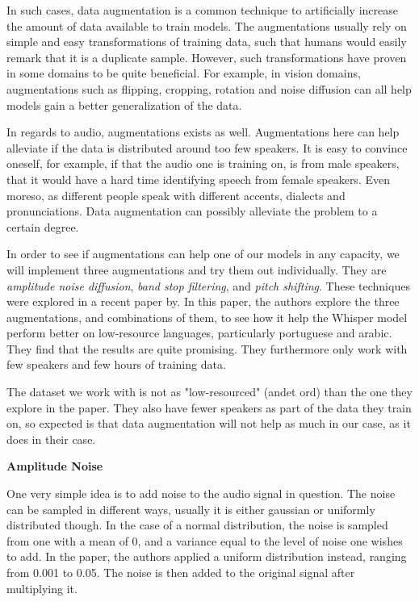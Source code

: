 In such cases, data augmentation is a common technique to artificially increase the amount of data available to train models. The augmentations usually rely on simple and easy transformations of training data, such that humans would easily remark that it is a duplicate sample. However, such transformations have proven in some domains to be quite beneficial. For example, in vision domains, augmentations such as flipping, cropping, rotation and noise diffusion can all help models gain a better generalization of the data.\cite{perez_effectiveness_2017}

In regards to audio, augmentations exists as well. Augmentations here can help alleviate if the data is distributed around too few speakers. It is easy to convince oneself, for example, if that the audio one is training on, is from male speakers, that it would have a hard time identifying speech from female speakers. Even moreso, as different people speak with different accents, dialects and pronunciations. Data augmentation can possibly alleviate the problem to a certain degree.

In order to see if augmentations can help one of our models in any capacity, we will implement three augmentations and try them out individually. They are \textit{amplitude noise diffusion}, \textit{band stop filtering}, and \textit{pitch shifting}. These techniques were explored in a recent paper by. \cite{anidjar_whisper_2024} In this paper, the authors explore the three augmentations, and combinations of them, to see how it help the Whisper model perform better on low-resource languages, particularly portuguese and arabic. They find that the results are quite promising. They furthermore only work with few speakers and few hours of training data.

The dataset we work with is not as "low-resourced" (andet ord) than the one they explore in the paper. They also have fewer speakers as part of the data they train on, so expected is that data augmentation will not help as much in our case, as it does in their case.

\textbf{Amplitude Noise}

One very simple idea is to add noise to the audio signal in question. The noise can be sampled in different ways, usually it is either gaussian or uniformly distributed though. In the case of a normal distribution, the noise is sampled from one with a mean of 0, and a variance equal to the level of noise one wishes to add. In the paper, the authors applied a uniform distribution instead, ranging from 0.001 to 0.05. The noise is then added to the original signal after multiplying it.

